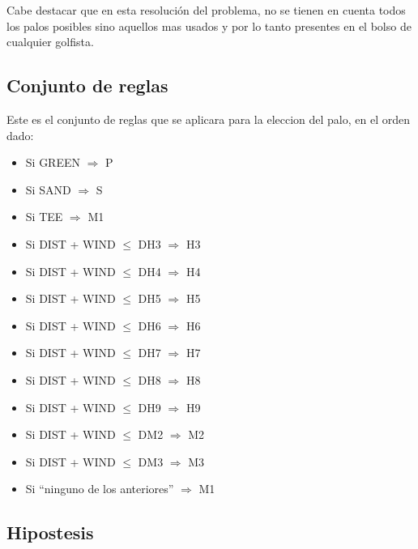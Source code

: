 \documentclass[runningheads,a4paper]{llncs}
\begin{document}
Cabe destacar que en esta resolución del problema, no se tienen en cuenta todos los palos posibles sino aquellos mas usados y por lo tanto presentes en el bolso de cualquier golfista.\\
\subsection{Conjunto de reglas}
Este es el conjunto de reglas que se aplicara para la eleccion del palo, en el orden dado:
\begin{itemize}

	\item Si GREEN $\Rightarrow$ P 
	
	\item Si SAND $\Rightarrow$ S
	
	\item Si TEE $\Rightarrow$ M1 
	
	\item Si DIST + WIND $\leq$ DH3 $\Rightarrow$ H3 
	
	\item Si DIST + WIND $\leq$ DH4 $\Rightarrow$ H4 
	
	\item Si DIST + WIND $\leq$ DH5 $\Rightarrow$ H5 
	
	\item Si DIST + WIND $\leq$ DH6 $\Rightarrow$ H6 
	
	\item Si DIST + WIND $\leq$ DH7 $\Rightarrow$ H7 
	
	\item Si DIST + WIND $\leq$ DH8 $\Rightarrow$ H8 
	
	\item Si DIST + WIND $\leq$ DH9 $\Rightarrow$ H9 
	
	\item Si DIST + WIND $\leq$ DM2 $\Rightarrow$ M2
	
	\item Si DIST + WIND $\leq$ DM3 $\Rightarrow$ M3
	
	\item Si “ninguno de los anteriores” $\Rightarrow$ M1
	
\end{itemize}


\subsection{Hipostesis}
\end{document}
